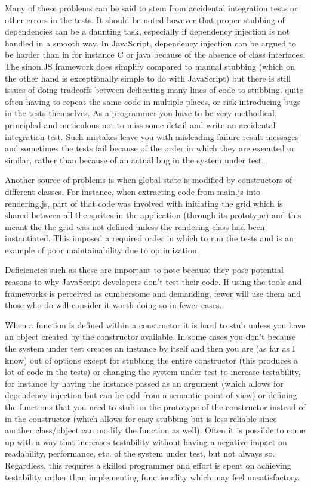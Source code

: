 \documentclass[11pt]{article}
\begin{document}
Many of these problems can be said to stem from accidental integration tests or other errors in the tests. It should be noted however that proper stubbing of dependencies can be a daunting task, especially if dependency injection is not handled in a smooth way. In JavaScript, dependency injection can be argued to be harder than in for instance C or java because of the absence of class interfaces. The sinon.JS framework does simplify compared to manual stubbing (which on the other hand is exceptionally simple to do with JavaScript) but there is still issues of doing tradeoffs between dedicating many lines of code to stubbing, quite often having to repeat the same code in multiple places, or risk introducing bugs in the tests themselves. As a programmer you have to be very methodical, principled and meticulous not to miss some detail and write an accidental integration test. Such mistakes leave you with misleading failure result messages and sometimes the tests fail because of the order in which they are executed or similar, rather than because of an actual bug in the system under test.

Another source of problems is when global state is modified by constructors of different classes. For instance, when extracting code from main.js into rendering.js, part of that code was involved with initiating the grid which is shared between all the sprites in the application (through its prototype) and this meant the the grid was not defined unless the rendering class had been instantiated. This imposed a required order in which to run the tests and is an example of poor maintainability due to optimization.

Deficiencies such as these are important to note because they pose potential reasons to why JavaScript developers don't test their code. If using the tools and frameworks is perceived as cumbersome and demanding, fewer will use them and those who do will consider it worth doing so in fewer cases.

When a function is defined within a constructor it is hard to stub unless you have an object created by the constructor available. In some cases you don't because the system under test creates an instance by itself and then you are (as far as I know) out of options except for stubbing the entire constructor (this produces a lot of code in the tests) or changing the system under test to increase testability, for instance by having the instance passed as an argument (which allows for dependency injection but can be odd from a semantic point of view) or defining the functions that you need to stub on the prototype of the constructor instead of in the constructor (which allows for easy stubbing but is less reliable since another class/object can modify the function as well). Often it is possible to come up with a way that increases testability without having a negative impact on readability, performance, etc. of the system under test, but not always so. Regardless, this requires a skilled programmer and effort is spent on achieving testability rather than implementing functionality which may feel unsatisfactory.
\end{document}
